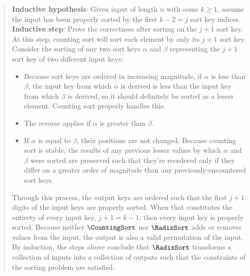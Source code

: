 \documentclass[11pt]{article}
\begin{document}
\begin{enumerate}
\begin{enumerate}
\begin{quote}
        \newline 
        \newline
        \textbf{Inductive hypothesis}: \newline 
        Given input of length $n$ with some $k \geq 1$, assume the input has been properly sorted by the first $k - 2 = j$ sort key indices. \newline
        \newline
        \textbf{Inductive step}: \newline 
        Prove the correctness after sorting on the $j + 1$ sort key. \newline 
        At this step, counting sort will sort each element by only its $j + 1$ sort key. Consider the sorting of any two sort keys $\alpha$ and $\beta$ representing the $j + 1$ sort key of two different input keys: 
        \begin{itemize}
            \item Because sort keys are ordered in increasing magnitude, if $\alpha$ is less than $\beta$, the input key from which $\alpha$ is derived is less than the input key from which $\beta$ is derived, so it should definitely be sorted as a lesser element. Counting sort properly handles this. 
            \item The reverse applies if $\alpha$ is greater than $\beta$. 
            \item If $\alpha$ is equal to $\beta$, their positions are not changed. Because counting sort is stable, the results of any previous lesser values by which $\alpha$ and $\beta$ were sorted are preserved such that they're reordered only if they differ on a greater order of magnitude than any previously-encountered sort keys. 
        \end{itemize}
           Through this process, the output keys are ordered such that the first $j + 1$ digits of the input keys are properly sorted. When that constitutes the entirety of every input key, $j + 1 = k - 1$, then every input key is properly sorted. Because neither $\CountingSort$ nor $\RadixSort$ adds or removes values from the input, the output is also a valid permutation of the input.
        \newline 
        \newline
        By induction, the steps above conclude that $\RadixSort$ transforms a collection of inputs into a collection of outputs such that the constraints of the sorting problem are satisfied.
    \end{quote}


\end{enumerate}
\end{enumerate}
\end{document}
